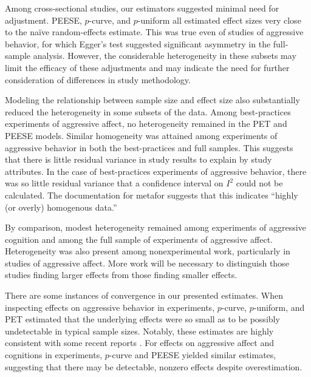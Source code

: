 \documentclass[man, mask]{apa6}
\begin{document}
Among cross-sectional studies, our estimators suggested minimal need for adjustment. PEESE, $p$-curve, and $p$-uniform all estimated effect sizes very close to the na{\"i}ve random-effects estimate. This was true even of studies of aggressive behavior, for which Egger's test suggested significant asymmetry in the full-sample analysis. However, the considerable heterogeneity in these subsets may limit the efficacy of these adjustments and may indicate the need for further consideration of differences in study methodology.

Modeling the relationship between sample size and effect size also substantially reduced the heterogeneity in some subsets of the data. Among best-practices experiments of aggressive affect, no heterogeneity remained in the PET and PEESE models. Similar homogeneity was attained among experiments of aggressive behavior in both the best-practices and full samples. This suggests that there is little residual variance in study results to explain by study attributes. In the case of best-practices experiments of aggressive behavior, there was so little residual variance that a confidence interval on $I^2$ could not be calculated. The documentation for metafor %
suggests that this indicates ``highly (or overly) homogenous data.'' \citep[helpfile for confint.rma.uni]{Veichtbauer:2010}

By comparison, modest heterogeneity remained among experiments of aggressive cognition and among the full sample of experiments of aggressive affect. Heterogeneity was also present among nonexperimental work, particularly in studies of aggressive affect. More work will be necessary to distinguish those studies finding larger effects from those finding smaller effects.

There are some instances of convergence in our presented estimates. When inspecting effects on aggressive behavior in experiments, $p$-curve, $p$-uniform, and PET estimated that the underlying effects were so small as to be possibly undetectable in typical sample sizes. Notably, these estimates are highly consistent with some recent reports \citep{Engelhardt:etal:2015,Kneer:etal:inpress,Tear:Nielsen:2014,Przybylski:etal:2014}. For effects on aggressive affect and cognitions in experiments, $p$-curve and PEESE yielded similar estimates, suggesting that there may be detectable, nonzero effects despite overestimation. 

\end{document}
